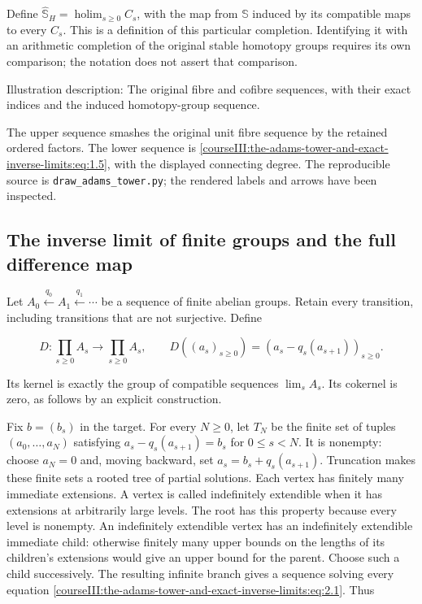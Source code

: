 Define \(\widehat{\mathbb S}_H=\operatorname{holim}_{s\geq0}C_s\), with the map from \(\mathbb S\) induced by its compatible maps to every \(C_s\). This is a definition of this particular completion. Identifying it with an arithmetic completion of the original stable homotopy groups requires its own comparison; the notation does not assert that comparison.

Illustration description: The original fibre and cofibre sequences, with their exact indices and the induced homotopy-group sequence.

The upper sequence smashes the original unit fibre sequence by the retained ordered factors. The lower sequence is \eqref{courseIII:the-adams-tower-and-exact-inverse-limits:eq:1.5}, with the displayed connecting degree. The reproducible source is \texttt{draw\_adams\_tower.py}; the rendered labels and arrows have been inspected.

\subsection{The inverse limit of finite groups and the full difference map}
\label{courseIII:the-adams-tower-and-exact-inverse-limits:section-2}

\label{courseIII:adams-tower:2}

Let \(A_0\xleftarrow{q_0}A_1\xleftarrow{q_1}\cdots\) be a sequence of finite abelian groups. Retain every transition, including transitions that are not surjective. Define

\begin{equation}
D:\prod_{s\geq0}A_s\longrightarrow\prod_{s\geq0}A_s,
 \qquad D((a_s)_{s\geq0})=(a_s-q_s(a_{s+1}))_{s\geq0}.
 \label{courseIII:the-adams-tower-and-exact-inverse-limits:eq:2.1}
\end{equation}

Its kernel is exactly the group of compatible sequences \(\lim_s A_s\). Its cokernel is zero, as follows by an explicit construction.

Fix \(b=(b_s)\) in the target. For every \(N\geq0\), let \(T_N\) be the finite set of tuples \((a_0,\ldots,a_N)\) satisfying
\(a_s-q_s(a_{s+1})=b_s\) for \(0\leq s<N\).
It is nonempty: choose \(a_N=0\) and, moving backward, set \(a_s=b_s+q_s(a_{s+1})\). Truncation makes these finite sets a rooted tree of partial solutions. Each vertex has finitely many immediate extensions. A vertex is called indefinitely extendible when it has extensions at arbitrarily large levels. The root has this property because every level is nonempty. An indefinitely extendible vertex has an indefinitely extendible immediate child: otherwise finitely many upper bounds on the lengths of its children's extensions would give an upper bound for the parent. Choose such a child successively. The resulting infinite branch gives a sequence solving every equation \eqref{courseIII:the-adams-tower-and-exact-inverse-limits:eq:2.1}. Thus

